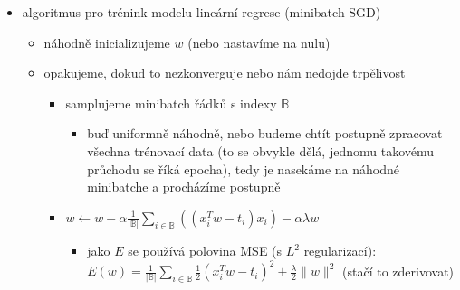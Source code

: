 \begin{itemize}
\begin{itemize}
\begin{itemize}
\begin{itemize}
\begin{itemize}
\end{itemize}
\item tomu se říká gradient descent
\end{itemize}
\item standard gradient descent - používáme všechna trénovací data k výpočtu $\nabla_wE(w)$
\item stochastic (online) gradient descent - používáme jeden náhodný řádek
\item minibatch stochastic gradient descent - používáme $B$ náhodných nezávislých řádků
\end{itemize}
\item algoritmus pro trénink modelu lineární regrese (minibatch SGD)
\begin{itemize}
\item náhodně inicializujeme $w$ (nebo nastavíme na nulu)
\item opakujeme, dokud to nezkonverguje nebo nám nedojde trpělivost
\begin{itemize}
\item samplujeme minibatch řádků s indexy $\mathbb B$
\begin{itemize}
\item buď uniformně náhodně, nebo budeme chtít postupně zpracovat všechna trénovací data (to se obvykle dělá, jednomu takovému průchodu se říká epocha), tedy je nasekáme na náhodné minibatche a procházíme postupně
\end{itemize}
\item $w\leftarrow w-\alpha\frac1{|\mathbb B|}\sum_{i\in \mathbb B}((x_i^Tw-t_i)x_i)-\alpha\lambda w$
\begin{itemize}
\item jako $E$ se používá polovina MSE (s $L^2$ regularizací): $E(w)=\frac1{|\mathbb B|}\sum_{i\in\mathbb B}\frac12 (x_i^Tw-t_i)^2+\frac{\lambda}2 \lVert w\rVert^2$ (stačí to zderivovat)
\end{itemize}
\end{itemize}
\end{itemize}
\end{itemize}
\end{itemize}

